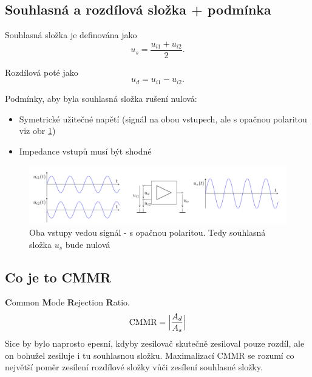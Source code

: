 \documentclass[a4paper,12pt]{article}   %
\DeclarePairedDelimiter\abs{\lvert}{\rvert}
\begin{document}
\subsection*{Souhlasná a rozdílová složka + podmínka}
Souhlasná složka je definována jako
\begin{equation*}
    u_s = \frac{u_{i1} + u_{i2}}{2}.
\end{equation*}

Rozdílová poté jako
\begin{equation*}
    u_d = u_{i1} - u_{i2}.
\end{equation*}

Podmínky, aby byla souhlasná složka rušení nulová:
\begin{itemize}
    \item Symetrické užitečné napětí (signál na obou vstupech, ale s opačnou polaritou viz obr \ref{fig:rozdilovy:signal})
    \item Impedance vstupů musí být shodné
\end{itemize}

\begin{figure}[h!]
    \centering
    \includegraphics[width = \textwidth]{rozdilovy-zesilovac-signal.PNG}
    \caption{Oba vstupy vedou signál - s opačnou polaritou. Tedy souhlasná složka $u_s$ bude nulová}
    \label{fig:rozdilovy:signal}
\end{figure}

\subsection*{Co je to CMMR}
\textbf{C}ommon \textbf{M}ode \textbf{R}ejection \textbf{R}atio.
\begin{equation}
    \text{CMMR} = \abs[\Big]{\frac{A_d}{A_s}}
\end{equation}
Sice by bylo naprosto epesní, kdyby zesilovač skutečně zesiloval pouze rozdíl, ale on bohužel zesiluje i tu souhlasnou složku. Maximalizací CMMR se rozumí co největší poměr zesílení rozdílové složky vůči zesílení souhlasné složky.
\end{document}
